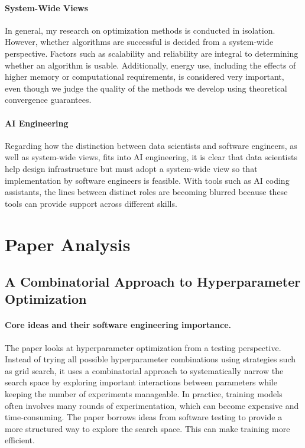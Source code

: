 \documentclass[12pt]{article}
\begin{document}
\paragraph{System-Wide Views} In general, my research on optimization methods is conducted in isolation. However, whether algorithms are successful is decided from a system-wide perspective. Factors such as scalability and reliability are integral to determining whether an algorithm is usable. Additionally, energy use, including the effects of higher memory or computational requirements, is considered very important, even though we judge the quality of the methods we develop using theoretical convergence guarantees.
\paragraph{AI Engineering} Regarding how the distinction between data scientists and software engineers, as well as system-wide views, fits into AI engineering, it is clear that data scientists help design infrastructure but must adopt a system-wide view so that implementation by software engineers is feasible. With tools such as AI coding assistants, the lines between distinct roles are becoming blurred because these tools can provide support across different skills.
\section{Paper Analysis}
\subsection{A Combinatorial Approach to Hyperparameter Optimization \cite{khadka2024combinatorial}}
\paragraph{Core ideas and their software engineering importance.}
The paper looks at hyperparameter optimization from a testing perspective. Instead of trying all possible hyperparameter combinations using strategies such as grid search, it uses a combinatorial approach to systematically narrow the search space by exploring important interactions between parameters while keeping the number of experiments manageable.
In practice, training models often involves many rounds of experimentation, which can become expensive and time-consuming. The paper borrows ideas from software testing to provide a more structured way to explore the search space. This can make training more efficient.
\end{document}
